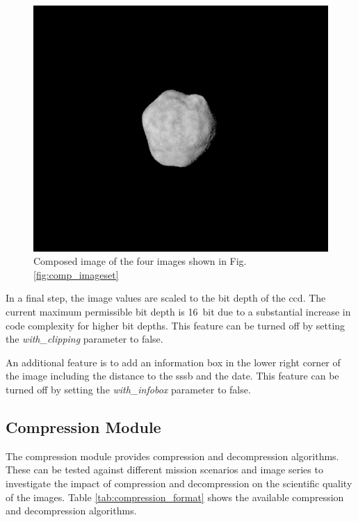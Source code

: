 \begin{figure}
    \centering
    \includegraphics[width=\textwidth]{doc/thesis/0_figures/composition/Comp_2017-08-15T115854-575000.png}
    \caption{Composed image of the four images shown in Fig. \ref{fig:comp_imageset}}
    \label{fig:comp_composed}
\end{figure}

In a final step, the image values are scaled to the bit depth of the \gls{ccd}. The current maximum permissible bit depth is \SI{16}{bit} due to a substantial increase in code complexity for higher bit depths. This feature can be turned off by setting the \textit{with\_clipping} parameter to false.

An additional feature is to add an information box in the lower right corner of the image including the distance to the \gls{sssb} and the date. This feature can be turned off by setting the \textit{with\_infobox} parameter to false.

\subsection{Compression Module}
The compression module provides compression and decompression algorithms. These can be tested against different mission scenarios and image series to investigate the impact of compression and decompression on the scientific quality of the images. Table \ref{tab:compression_format} shows the available compression and decompression algorithms.

